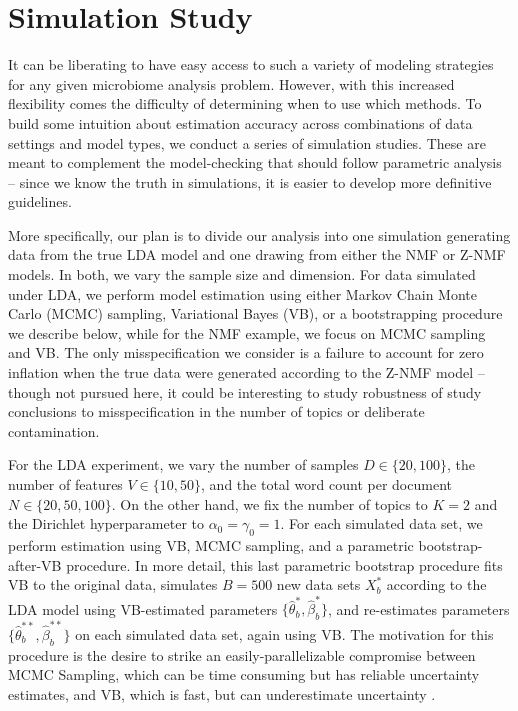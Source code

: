 \documentclass[oupdraft]{bio}
\begin{document}
\section{Simulation Study}

It can be liberating to have easy access to such a variety of modeling
strategies for any given microbiome analysis problem. However, with this
increased flexibility comes the difficulty of determining when to use which
methods. To build some intuition about estimation accuracy across combinations
of data settings and model types, we conduct a series of simulation studies. These are
meant to complement the model-checking that should follow parametric analysis --
since we know the truth in simulations, it is easier to develop more definitive
guidelines.

More specifically, our plan is to divide our analysis into one simulation
generating data from the true LDA model and one drawing from either the NMF or
Z-NMF models. In both, we vary the sample size and dimension. For data simulated
under LDA, we perform model estimation using either Markov Chain Monte Carlo
(MCMC) sampling, Variational Bayes (VB), or a bootstrapping procedure we
describe below, while for the NMF example, we focus on MCMC sampling and VB. The
only misspecification we consider is a failure to account for zero inflation
when the true data were generated according to the Z-NMF model -- though not
pursued here, it could be interesting to study robustness of study conclusions
to misspecification in the number of topics or deliberate contamination.

For the LDA experiment, we vary the number of samples $D \in \{20, 100\}$, the
number of features $V \in \{10, 50\}$, and the total word count per document $N
\in \{20, 50, 100\}$. On the other hand, we fix the number of topics to $K = 2$
and the Dirichlet hyperparameter to $\alpha_{0} = \gamma_{0} = 1$. For each
simulated data set, we perform estimation using VB, MCMC
sampling, and a parametric bootstrap-after-VB procedure. In more detail, this
last parametric bootstrap procedure fits VB to the original data, simulates $B =
500$ new data sets $X^{\ast}_{b}$ according to the LDA model using VB-estimated
parameters $\{\hat{\theta}^{\ast}_{b}, \hat{\beta}^{\ast}_{b}\}$, and
re-estimates parameters $\{\hat{\theta}^{\ast\ast}_{b},
\hat{\beta}^{\ast\ast}_{b}\}$ on each simulated data set, again using VB. The
motivation for this procedure is the desire to strike an easily-parallelizable
compromise between MCMC Sampling, which can be time consuming but has reliable
uncertainty estimates, and VB, which is fast, but can
underestimate uncertainty \citep{wang2005inadequacy}.
\end{document}
